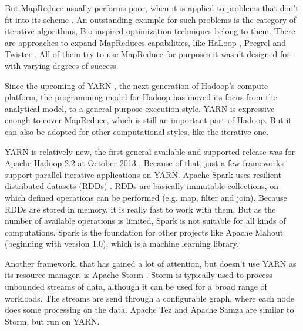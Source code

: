 
But MapReduce usually performs poor, when it is applied to problems that don't fit into its scheme \cite{ekanayake2008mapreduce}\cite{bu2010haloop}\cite{rosen2013iterative}\cite{ye2009stochastic}. An outstanding example for such problems is the category of iterative algorithms, Bio-inspired optimization techniques belong to them. There are approaches to expand MapReduces capabilities, like HaLoop \cite{bu2010haloop}, Pregrel \cite{malewicz2010pregel} and Twister \cite{ekanayake2010twister}. All of them try to use MapReduce for purposes it wasn't designed for - with varying degrees of success.

Since the upcoming of YARN \cite{vavilapalli2013apache}, the next generation of Hadoop's compute platform, the programming model for Hadoop has moved its focus from the analytical model, to a general purpose execution style. YARN is expressive enough to cover MapReduce, which is still an important part of Hadoop. But it can also be adopted for other computational styles, like the iterative one.

YARN is relatively new, the first general available and supported release was for Apache Hadoop 2.2 at October 2013 \cite{hadoop-2.2.0}. Because of that, just a few frameworks support parallel iterative applications on YARN. Apache Spark \cite{spark}\cite{zaharia2012resilient} uses resilient distributed datasets (RDDs) \cite{zaharia2012resilient}. RDDs are basically immutable collections, on which defined operations can be performed (e.g. map, filter and join). Because RDDs are stored in memory, it is really fast to work with them. But as the number of available operations is limited, Spark is not suitable for all kinds of computations. Spark is the foundation for other projects like Apache Mahout \cite{mahout} (beginning with version 1.0), which is a machine learning library.

Another framework, that has gained a lot of attention, but doesn't use YARN as its resource manager, is Apache Storm \cite{storm}. Storm is typically used to process unbounded streams of data, although it can be used for a broad range of workloads. The streams are send through a configurable graph, where each node does some processing on the data. Apache Tez \cite{tez} and Apache Samza \cite{samza} are similar to Storm, but run on YARN.


